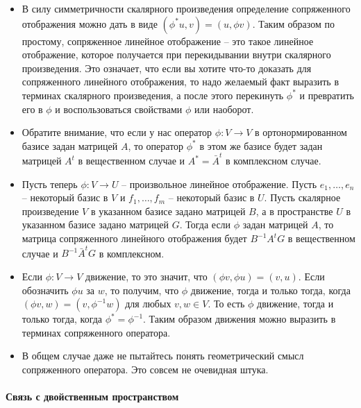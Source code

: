 \begin{itemize}
\item В силу симметричности скалярного произведения определение сопряженного отображения можно дать в виде $(\phi^* u, v) = (u, \phi v)$.
Таким образом по простому, сопряженное линейное отображение  -- это такое линейное отображение, которое получается при перекидывании внутри скалярного произведения.
Это означает, что если вы хотите что-то доказать для сопряженного линейного отображения, то надо желаемый факт выразить в терминах скалярного произведения, а после этого перекинуть $\phi^*$ и превратить его в $\phi$ и воспользоваться свойствами $\phi$ или наоборот.

\item Обратите внимание, что если у нас оператор $\phi\colon V\to V$ в ортонормированном базисе задан матрицей $A$, то оператор $\phi^*$ в этом же базисе будет задан матрицей $A^t$ в вещественном случае и $A^* = \bar A^t$ в комплексном случае.

\item Пусть теперь $\phi\colon V\to U$ -- произвольное линейное отображение.
Пусть $e_1,\ldots,e_n$ -- некоторый базис в $V$ и $f_1,\ldots, f_m$ -- некоторый базис в $U$.
Пусть скалярное произведение $V$ в указанном базисе задано матрицей $B$, а в пространстве $U$ в указанном базисе задано матрицей $G$.
Тогда если $\phi$ задан матрицей $A$, то матрица сопряженного линейного отображения будет $B^{-1} A^t G$ в вещественном случае и $B^{-1}\bar A^t G$ в комплексном.

\item Если $\phi\colon V\to V$ движение, то это значит, что $(\phi v, \phi u) = (v, u)$.
Если обозначить $\phi u $ за $w$, то получим, что $\phi$ движение, тогда и только тогда, когда $(\phi v, w) = (v, \phi^{-1}w)$ для любых $v,w\in V$.
То есть $\phi$ движение, тогда и только тогда, когда $\phi^* = \phi^{-1}$.
Таким образом движения можно выразить в терминах сопряженного оператора.

\item В общем случае даже не пытайтесь понять геометрический смысл сопряженного оператора.
Это совсем не очевидная штука.
\end{itemize}

\paragraph{Связь с двойственным пространством}

